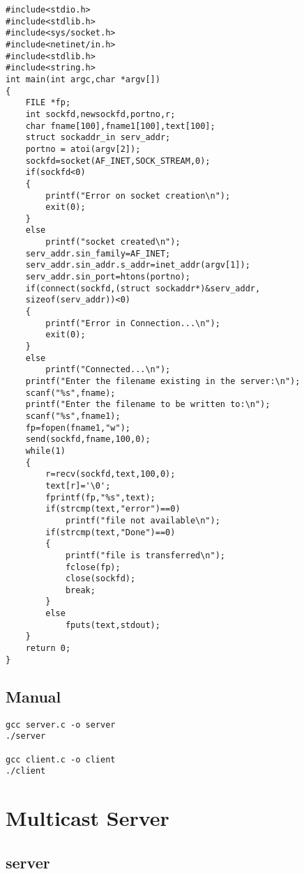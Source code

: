 \documentclass[12pt]{article}
\begin{document}
\begin{lstlisting}
#include<stdio.h>
#include<stdlib.h> 
#include<sys/socket.h> 
#include<netinet/in.h> 
#include<stdlib.h>
#include<string.h>
int main(int argc,char *argv[]) 
{ 
	FILE *fp;
	int sockfd,newsockfd,portno,r;
	char fname[100],fname1[100],text[100];
	struct sockaddr_in serv_addr;
	portno = atoi(argv[2]);
	sockfd=socket(AF_INET,SOCK_STREAM,0);
	if(sockfd<0)
	{
		printf("Error on socket creation\n");
		exit(0);
	}
	else
		printf("socket created\n");
	serv_addr.sin_family=AF_INET; 
	serv_addr.sin_addr.s_addr=inet_addr(argv[1]);
	serv_addr.sin_port=htons(portno); 
	if(connect(sockfd,(struct sockaddr*)&serv_addr,
	sizeof(serv_addr))<0) 
	{
		printf("Error in Connection...\n"); 
		exit(0);
	}
	else 
		printf("Connected...\n"); 
	printf("Enter the filename existing in the server:\n");
	scanf("%s",fname);
	printf("Enter the filename to be written to:\n");
	scanf("%s",fname1);
	fp=fopen(fname1,"w");
	send(sockfd,fname,100,0);
	while(1)
	{
		r=recv(sockfd,text,100,0);
		text[r]='\0';
		fprintf(fp,"%s",text);
		if(strcmp(text,"error")==0)
			printf("file not available\n");
		if(strcmp(text,"Done")==0)
		{
			printf("file is transferred\n");
			fclose(fp);
			close(sockfd);
			break;
		}
		else
			fputs(text,stdout);
	}
	return 0;
}
\end{lstlisting}

\subsection{Manual}

\begin{lstlisting}
gcc server.c -o server
./server

gcc client.c -o client
./client
\end{lstlisting}




\section{Multicast Server}
\subsection{server}
\end{document}

